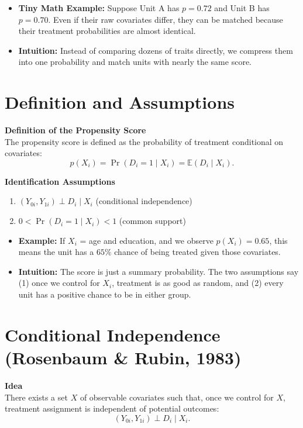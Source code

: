 \documentclass[12pt]{article}
\begin{document}
\begin{itemize}
    \item \textbf{Tiny Math Example:} Suppose Unit A has $p=0.72$ and Unit B has $p=0.70$. Even if their raw covariates differ, they can be matched because their treatment probabilities are almost identical.
    \item \textbf{Intuition:} Instead of comparing dozens of traits directly, we compress them into one probability and match units with nearly the same score.
\end{itemize}

\section*{\noindent\textbf{Definition and Assumptions}}

\textbf{Definition of the Propensity Score} \\
The propensity score is defined as the probability of treatment conditional on covariates:
\[
p(X_i) = \Pr(D_i = 1 \mid X_i) = \mathbb{E}(D_i \mid X_i).
\]

\textbf{Identification Assumptions}
\begin{enumerate}
    \item $(Y_{0i}, Y_{1i}) \perp D_i \mid X_i$ \hfill (conditional independence)
    \item $0 < \Pr(D_i = 1 \mid X_i) < 1$ \hfill (common support)
\end{enumerate}

\begin{itemize}
    \item \textbf{Example:} If $X_i$ = age and education, and we observe $p(X_i)=0.65$, this means the unit has a $65\%$ chance of being treated given those covariates.
    \item \textbf{Intuition:} The score is just a summary probability. The two assumptions say (1) once we control for $X_i$, treatment is as good as random, and (2) every unit has a positive chance to be in either group.
\end{itemize}

\section*{\noindent\textbf{Conditional Independence (Rosenbaum \& Rubin, 1983)}}

\textbf{Idea} \\
There exists a set $X$ of observable covariates such that, once we control for $X$, treatment assignment is independent of potential outcomes:
\[
(Y_{0i}, Y_{1i}) \perp D_i \mid X_i.
\]
\end{document}
